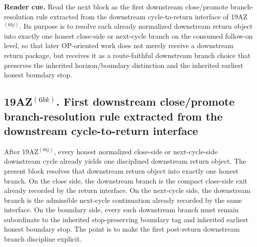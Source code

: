 \noindent\textbf{Reader cue.} Read the next block as the first downstream close/promote branch-resolution rule extracted from the downstream cycle-to-return interface of 19AZ$^{(6bj)}$. Its purpose is to resolve each already normalized downstream return object into exactly one honest close-side or next-cycle branch on the consumed follow-on level, so that later OP-oriented work does not merely receive a downstream return package, but receives it as a route-faithful downstream branch choice that preserves the inherited horizon/boundary distinction and the inherited earliest honest boundary stop.

\subsection*{19AZ$^{(6bk)}$. First downstream close/promote branch-resolution rule extracted from the downstream cycle-to-return interface}
\label{sec:first-downstream-close-promote-branch-resolution-rule-extracted-from-the-downstream-cycle-to-return-interface}
After 19AZ$^{(6bj)}$, every honest normalized close-side or next-cycle-side downstream cycle already yields one disciplined downstream return object. The present block resolves that downstream return object into exactly one honest branch. On the close side, the downstream branch is the compact close-side exit already recorded by the return interface. On the next-cycle side, the downstream branch is the admissible next-cycle continuation already recorded by the same interface. On the boundary side, every such downstream branch must remain subordinate to the inherited stop-preserving boundary tag and inherited earliest honest boundary stop. The point is to make the first post-return downstream branch discipline explicit.

